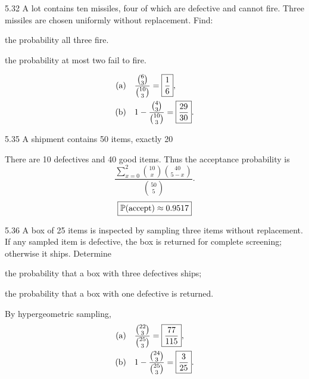 \documentclass[11pt,oneside]{article}
\begin{document}
\begin{exercise}{5.32}
A lot contains ten missiles, four of which are defective and cannot fire. Three missiles are chosen uniformly without replacement. Find:
\begin{exercisesubparts}
\item the probability all three fire.
\item the probability at most two fail to fire.
\end{exercisesubparts}
\end{exercise}

\begin{solution}
\begin{align*}
\textup{(a)}\quad&\frac{\binom{6}{3}}{\binom{10}{3}}=\boxed{\frac16},\\
\textup{(b)}\quad&1-\frac{\binom{4}{3}}{\binom{10}{3}}=\boxed{\frac{29}{30}}.
\end{align*}
\end{solution}

\begin{exercise}{5.35}
A shipment contains 50 items, exactly 20%
\end{exercise}

\begin{solution}
There are 10 defectives and 40 good items. Thus the acceptance probability is
\[
\boxed{\frac{\displaystyle\sum_{x=0}^2\binom{10}{x}\binom{40}{5-x}}{\binom{50}{5}}}.
\]
\[
\boxed{\mathbb{P}(\text{accept})\approx 0.9517}
\]
\end{solution}

\begin{exercise}{5.36}
A box of 25 items is inspected by sampling three items without replacement. If any sampled item is defective, the box is returned for complete screening; otherwise it ships. Determine
\par
\begin{exercisesubparts}
\item the probability that a box with three defectives ships;
\item the probability that a box with one defective is returned.
\end{exercisesubparts}
\end{exercise}

\begin{solution}
By hypergeometric sampling,
\begin{align*}
\textup{(a)}\quad&\frac{\binom{22}{3}}{\binom{25}{3}}=\boxed{\frac{77}{115}},\\
\textup{(b)}\quad&1-\frac{\binom{24}{3}}{\binom{25}{3}}=\boxed{\frac3{25}}.
\end{align*}
\end{solution}
\end{document}
